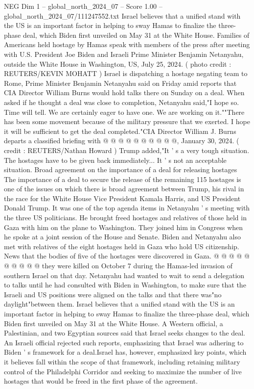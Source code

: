 \begin{textsample}{NEG Dim 1 – global\_north\_2024\_07 – Score 1.00 – global\_north\_2024\_07/111247552.txt}  \label{ex:f1_neg_067}
Israel believes that a unified stand with the US is an important factor in helping to sway Hamas to finalize the three-phase deal, which Biden first unveiled on May 31 at the White House.
Families of Americans held hostage by Hamas speak with members of the press after meeting with U.S.
President Joe Biden and Israeli Prime Minister Benjamin Netanyahu, outside the White House in Washington, US, July 25, 2024. ( photo credit : REUTERS/KEVIN MOHATT ) Israel is dispatching a hostage negating team to Rome, Prime Minister Benjamin Netanyahu said on Friday amid reports that CIA Director William Burns would hold talks there on Sunday on a deal.
When asked if he thought a deal was close to completion, Netanyahu said,"I hope so.
Time will tell.
We are certainly eager to have one.
We are working on it.""There has been some movement because of the military pressure that we exerted.
I hope it will be sufficient to get the deal completed."CIA Director William J.
Burns departs a classified briefing with @ @ @ @ @ @ @ @ @ @, January 30, 2024. ( credit : REUTERS/Nathan Howard ) Trump added,"It ' s a very tough situation.
The hostages have to be given back immediately...
It ' s not an acceptable situation.
Broad agreement on the importance of a deal for releasing hostages The importance of a deal to secure the release of the remaining 115 hostages is one of the issues on which there is broad agreement between Trump, his rival in the race for the White House Vice President Kamala Harris, and US President Donald Trump.
It was one of the top agenda items in Netanyahu ' s meeting with the three US politicians.
He brought freed hostages and relatives of those held in Gaza with him on the plane to Washington.
They joined him in Congress when he spoke at a joint session of the House and Senate.
Biden and Netanyahu also met with relatives of the eight hostages held in Gaza who hold US citizenship.
News that the bodies of five of the hostages were discovered in Gaza. @ @ @ @ @ @ @ @ @ @ they were killed on October 7 during the Hamas-led invasion of southern Israel on that day.
Netanyahu had wanted to wait to send a delegation to talks until he had consulted with Biden in Washington, to make sure that the Israeli and US positions were aligned on the talks and that there was"no daylight"between them.
Israel believes that a unified stand with the US is an important factor in helping to sway Hamas to finalize the three-phase deal, which Biden first unveiled on May 31 at the White House.
A Western official, a Palestinian, and two Egyptian sources said that Israel seeks changes to the deal.
An Israeli official rejected such reports, emphasizing that Israel was adhering to Biden ' s framework for a deal.Israel has, however, emphasized key points, which it believes fall within the scope of that framework, including retaining military control of the Philadelphi Corridor and seeking to maximize the number of live hostages that would be freed in the first phase of the agreement.

\end{textsample}
